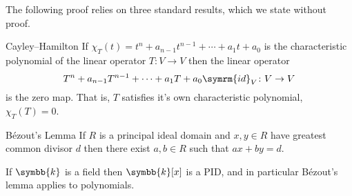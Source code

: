\documentclass[fleqn]{NotesClass}
\renewcommand{\field}{\symbb{k}}
\newcommand{\id}{\symrm{id}}
\begin{document}
    The following proof relies on three standard results, which we state without proof.
    \begin{thm}{Cayley--Hamilton}{}
        If \(\chi_T(t) = t^n + a_{n-1}t^{n-1} + \dotsb + a_1t + a_0\) is the characteristic polynomial of the linear operator \(T \colon V \to V\) then the linear operator
        \begin{equation}
            T^n + a_{n-1}T^{n-1} + \dotsb + a_1T + a_0\id_V \colon V \to V
        \end{equation}
        is the zero map.
        That is, \(T\) satisfies it's own characteristic polynomial, \(\chi_T(T) = 0\).
    \end{thm}
    
    \begin{lma}{B\'ezout's Lemma}{}
        If \(R\) is a principal ideal domain and \(x, y \in R\) have greatest common divisor \(d\) then there exist \(a, b \in R\) such that \(ax + by = d\).
    \end{lma}
    
    \begin{lma}{}{}
        If \(\field\) is a field then \(\field[x]\) is a PID, and in particular B\'ezout's lemma applies to polynomials.
    \end{lma}
    
\end{document}
